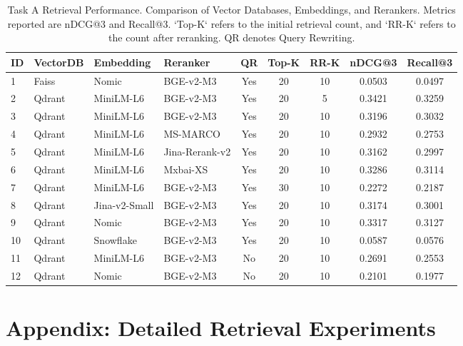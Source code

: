 \documentclass[11pt]{article}
\begin{document}
\begin{table}[ht!]
\centering
\small
\setlength{\tabcolsep}{4pt} %
\begin{tabular}{l l l l c c c c c}
\hline
\textbf{ID} & \textbf{VectorDB} & \textbf{Embedding} & \textbf{Reranker} & \textbf{QR} & \textbf{Top-K} & \textbf{RR-K} & \textbf{nDCG@3} & \textbf{Recall@3} \\
\hline
1 & Faiss & Nomic & BGE-v2-M3 & Yes & 20 & 10 & 0.0503 & 0.0497 \\
2 & Qdrant & MiniLM-L6 & BGE-v2-M3 & Yes & 20 & 5 & 0.3421 & 0.3259 \\
3 & Qdrant & MiniLM-L6 & BGE-v2-M3 & Yes & 20 & 10 & 0.3196 & 0.3032 \\
4 & Qdrant & MiniLM-L6 & MS-MARCO & Yes & 20 & 10 & 0.2932 & 0.2753 \\
5 & Qdrant & MiniLM-L6 & Jina-Rerank-v2 & Yes & 20 & 10 & 0.3162 & 0.2997 \\
6 & Qdrant & MiniLM-L6 & Mxbai-XS & Yes & 20 & 10 & 0.3286 & 0.3114 \\
7 & Qdrant & MiniLM-L6 & BGE-v2-M3 & Yes & 30 & 10 & 0.2272 & 0.2187 \\
8 & Qdrant & Jina-v2-Small & BGE-v2-M3 & Yes & 20 & 10 & 0.3174 & 0.3001 \\
9 & Qdrant & Nomic & BGE-v2-M3 & Yes & 20 & 10 & 0.3317 & 0.3127 \\
10 & Qdrant & Snowflake & BGE-v2-M3 & Yes & 20 & 10 & 0.0587 & 0.0576 \\
11 & Qdrant & MiniLM-L6 & BGE-v2-M3 & No & 20 & 10 & 0.2691 & 0.2553 \\
12 & Qdrant & Nomic & BGE-v2-M3 & No & 20 & 10 & 0.2101 & 0.1977 \\
\hline
\end{tabular}
\caption{Task A Retrieval Performance. Comparison of Vector Databases, Embeddings, and Rerankers. Metrics reported are nDCG@3 and Recall@3. `Top-K` refers to the initial retrieval count, and `RR-K` refers to the count after reranking. QR denotes Query Rewriting.}
\label{tab:task_a_results}
\end{table}


\section{Appendix: Detailed Retrieval Experiments}
\label{sec:appendix_results}
\end{document}
